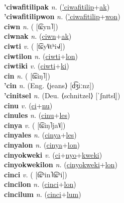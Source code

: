  \label{'ciwafitilip} \\
\textbf{'ciwafitilipak} \textit{n.} (\hyperref['ciwafitilip]{'ciwafitilip}+\hyperref[ak]{ak})
 \label{'ciwafitilipak} \\
\textbf{'ciwafitilipwon} \textit{n.} (\hyperref['ciwafitilip]{'ciwafitilip}+\hyperref[won]{won})
 \label{'ciwafitilipwon} \\
\textbf{ciwn} \textit{n.} ( [t͡ɕyn˥])
 \label{ciwn} \\
\textbf{ciwnak} \textit{n.} (\hyperref[ciwn]{ciwn}+\hyperref[ak]{ak})
 \label{ciwnak} \\
\textbf{ciwti} \textit{v.} ( [t͡ɕy˥˩tʰi˧˩˧])
 \label{ciwti} \\
\textbf{ciwtilon} \textit{n.} (\hyperref[ciwti]{ciwti}+\hyperref[lon]{lon})
 \label{ciwtilon} \\
\textbf{ciwtiki} \textit{v.} (\hyperref[ciwti]{ciwti}+\hyperref[ki]{ki})
 \label{ciwtiki} \\
\textbf{cin} \textit{n.} ( [t͡ɕiŋ˥])
 \label{cin} \\
\textbf{'cin} \textit{n.} (Eng. ⟨jeans⟩ [d͡ʒiːnz])
 \label{'cin} \\
\textbf{'cinitsel} \textit{n.} (Deu. ⟨schnitzel⟩ [ˈʃnɪtsl̩])
 \label{'cinitsel} \\
\textbf{cinu} \textit{v.} (\hyperref[ci]{ci}+\hyperref[nu]{nu})
 \label{cinu} \\
\textbf{cinules} \textit{n.} (\hyperref[cinu]{cinu}+\hyperref[les]{les})
 \label{cinules} \\
\textbf{cinya} \textit{v.} ( [t͡ɕiŋ˥ja˥˩])
 \label{cinya} \\
\textbf{cinyales} \textit{n.} (\hyperref[cinya]{cinya}+\hyperref[les]{les})
 \label{cinyales} \\
\textbf{cinyalon} \textit{n.} (\hyperref[cinya]{cinya}+\hyperref[lon]{lon})
 \label{cinyalon} \\
\textbf{cinyokweki} \textit{v.} (\hyperref[ci]{ci}+\hyperref[nyo]{nyo}+\hyperref[kweki]{kweki})
 \label{cinyokweki} \\
\textbf{cinyokwekilon} \textit{n.} (\hyperref[cinyokweki]{cinyokweki}+\hyperref[lon]{lon})
 \label{cinyokwekilon} \\
\textbf{cinci} \textit{v.} ( [t͡ɕʰin˥t͡ɕʰi])
 \label{cinci} \\
\textbf{cincilon} \textit{n.} (\hyperref[cinci]{cinci}+\hyperref[lon]{lon})
 \label{cincilon} \\
\textbf{cincilum} \textit{n.} (\hyperref[cinci]{cinci}+\hyperref[lum]{lum})
